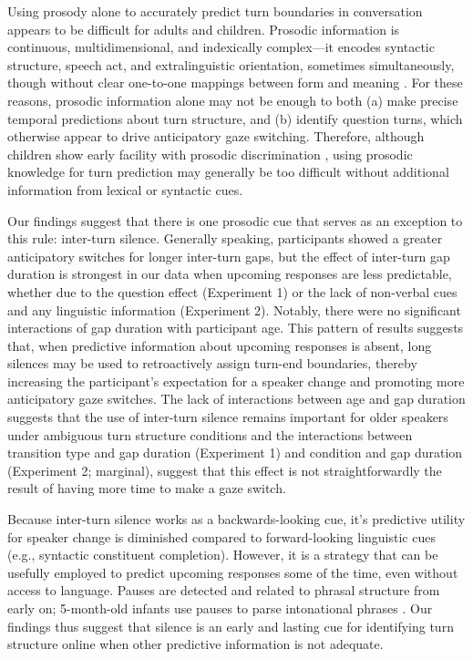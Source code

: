 \documentclass[authoryear, 12pt]{elsarticle}
\begin{document}
Using prosody alone to accurately predict turn boundaries in conversation appears to be difficult for adults and children. Prosodic information is continuous, multidimensional, and indexically complex---it encodes syntactic structure, speech act, and extralinguistic orientation, sometimes simultaneously, though without clear one-to-one mappings between form and meaning \citep{cutler1997, shriberg1998, lammertink2015}. For these reasons, prosodic information alone may not be enough to both (a) make precise temporal predictions about turn structure, and (b) identify question turns, which otherwise appear to drive anticipatory gaze switching. Therefore, although children show early facility with prosodic discrimination \citep{nazzi2003, soderstrom2003, johnson2001, jusczyk1995, morgan1995, mehler1988}, using prosodic knowledge for turn prediction may generally be too difficult without additional information from lexical or syntactic cues.

Our findings suggest that there is one prosodic cue that serves as an exception to this rule: inter-turn silence. Generally speaking, participants showed a greater anticipatory switches for longer inter-turn gaps, but the effect of inter-turn gap duration is strongest in our data when upcoming responses are less predictable, whether due to the question effect (Experiment 1) or the lack of non-verbal cues and any linguistic information (Experiment 2). Notably, there were no significant interactions of gap duration with participant age. This pattern of results suggests that, when predictive information about upcoming responses is absent, long silences may be used to retroactively assign turn-end boundaries, thereby increasing the participant's expectation for a speaker change and promoting more anticipatory gaze switches. The lack of interactions between age and gap duration suggests that the use of inter-turn silence remains important for older speakers under ambiguous turn structure conditions and the interactions between transition type and gap duration (Experiment 1) and condition and gap duration (Experiment 2; marginal), suggest that this effect is not straightforwardly the result of having more time to make a gaze switch.

Because inter-turn silence works as a backwards-looking cue, it's predictive utility for speaker change is diminished compared to forward-looking linguistic cues (e.g., syntactic constituent completion). However, it is a strategy that can be usefully employed to predict upcoming responses some of the time, even without access to language. Pauses are detected and related to phrasal structure from early on; 5-month-old infants use pauses to parse intonational phrases \citep{mannel2009}. Our findings thus suggest that silence is an early and lasting cue for identifying turn structure online when other predictive information is not adequate.
\end{document}
